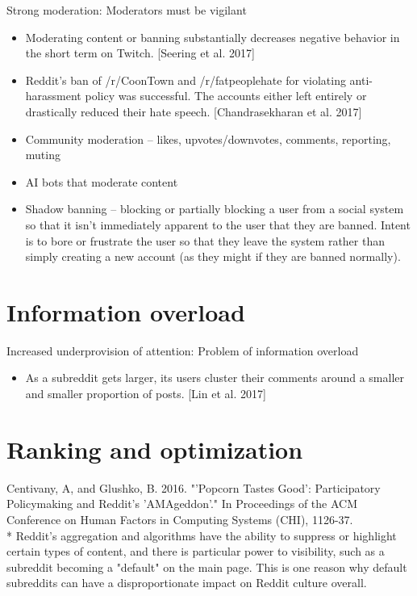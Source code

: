 \documentclass[class=book, crop=false]{standalone}
\begin{document}
Strong moderation: Moderators must be vigilant
\begin{itemize}
    \item Moderating content or banning substantially decreases negative behavior in the short term on Twitch. [Seering et al. 2017]
    \item Reddit’s ban of /r/CoonTown and /r/fatpeoplehate for violating anti-harassment policy was successful. The accounts either left entirely or drastically reduced their hate speech. [Chandrasekharan et al. 2017]
    \item Community moderation -- likes, upvotes/downvotes, comments, reporting, muting
    \item AI bots that moderate content
    \item Shadow banning -- blocking or partially blocking a user from a social system so that it isn’t immediately apparent to the user that they are banned. Intent is to bore or frustrate the user so that they leave the system rather than simply creating a new account (as they might if they are banned normally).
\end{itemize}

\section{Information overload}

Increased underprovision of attention: Problem of information overload
\begin{itemize}
    \item As a subreddit gets larger, its users cluster their comments around a smaller and smaller proportion of posts. [Lin et al. 2017]
\end{itemize}

\section{Ranking and optimization}

Centivany, A, and Glushko, B. 2016. "'Popcorn Tastes Good': Participatory Policymaking and Reddit's 'AMAgeddon'." In Proceedings of the ACM Conference on Human Factors in Computing Systems (CHI), 1126-37.\\
 * Reddit's aggregation and algorithms have the ability to suppress or highlight certain types of content, and there is particular power to visibility, such as a subreddit becoming a "default" on the main page. This is one reason why default subreddits can have a disproportionate impact on Reddit culture overall.
\end{document}
